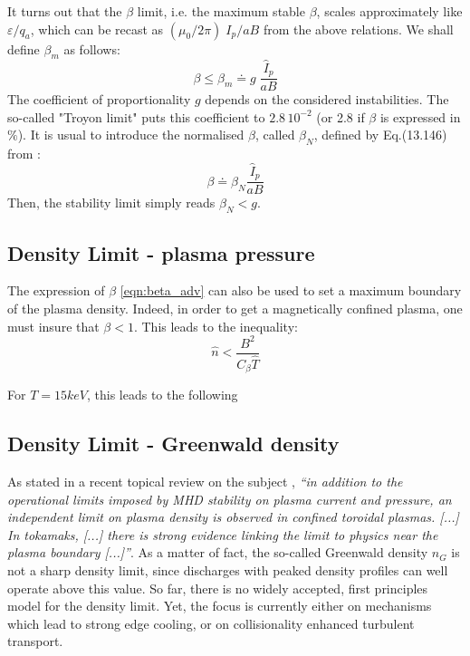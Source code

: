 It turns out that the $\beta$ limit, i.e. the maximum stable $\beta$, scales approximately like $\varepsilon/q_a$, which can be recast as $(\mu_0/2\pi)\; I_p/aB$ from the above relations. We shall define $\beta_m$ as follows:
\begin{equation*}
\beta \leqslant \beta_m \doteq g\; \frac{\hat I_p}{a B}
\end{equation*}
The coefficient of proportionality $g$ depends on the considered instabilities. The so-called "Troyon limit"  puts this coefficient to $2.8\, 10^{-2}$ (or 2.8 if $\beta$ is expressed in $\%$).
It is usual to introduce the normalised $\beta$, called $\beta_N$, defined by Eq.(13.146) from :
\begin{equation}
\beta \doteq \beta_N \frac{\hat I_p}{a B}
\end{equation}
Then, the stability limit simply reads $\beta_N <g$.

\subsection{Density Limit - plasma pressure}
The expression of $\beta$ \ref{eqn:beta_adv} can also be used to set a maximum boundary of the plasma density. Indeed, in order to get a magnetically confined plasma, one must insure that $\beta < 1$. This leads to the inequality:
\begin{equation}
    \hat n < \frac{B^2}{C_\beta \hat T}
\end{equation}

For $T=15 \si{keV}$, this leads to the following  

\subsection{Density Limit - Greenwald density}

As stated in a recent topical review on the subject , \emph{``in addition to the operational limits imposed by MHD stability on plasma current and pressure, an independent limit on plasma density is observed in confined toroidal plasmas. [...] In tokamaks, [...] there is strong evidence linking the limit to physics near the plasma boundary [...]''}. As a matter of fact, the so-called Greenwald density $n_G$ is not a sharp density limit, since discharges with peaked density profiles can well operate above this value. So far, there is no widely accepted, first principles model for the density limit. Yet, the focus is currently either on mechanisms which lead to strong edge cooling, or on collisionality enhanced turbulent transport.

